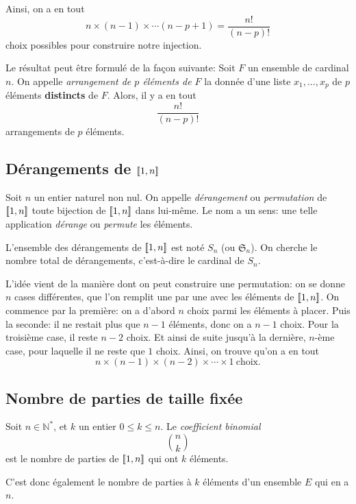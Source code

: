 \documentclass[11pt]{article}
\newcommand{\N}{\mathbb N}
\DeclarePairedDelimiter{\zint}{[\![}{]\!]}
\theoremstyle{definition}
\theoremstyle{remark}
\theoremstyle{theorem}
\begin{document}
Ainsi, on a en tout
\[
n\times (n-1)\times \cdots (n-p+1) = \frac{n!}{(n-p)!}
\]
choix possibles pour construire notre injection.

\begin{rem}
Le résultat peut être formulé de la façon suivante: Soit $F$ un ensemble de cardinal $n$. On appelle \textit{arrangement de $p$ éléments de $F$} la donnée d'une liste $x_1,\ldots,x_p$ de $p$ éléments \textbf{distincts} de $F$. Alors, il y a en tout
\[
\frac{n!}{(n-p)!}
\]
arrangements de $p$ éléments.
\end{rem}


\subsection{Dérangements de $\zint{1,n}$}

Soit $n$ un entier naturel non nul. On appelle \textit{dérangement} ou \textit{permutation} de $\zint{1,n}$ toute bijection de $\zint{1,n}$ dans lui-même. Le nom a un sens: une telle application \textit{dérange} ou \textit{permute} les éléments.

L'ensemble des dérangements de $\zint{1,n}$ est noté $S_n$ (ou $\mathfrak{S}_n$). On cherche le nombre total de dérangements, c'est-à-dire le cardinal de $S_n$.

L'idée vient de la manière dont on peut construire une permutation: on se donne $n$ cases différentes, que l'on remplit une par une avec les éléments de $\zint{1,n}$. On commence par la première: on a d'abord $n$ choix parmi les éléments à placer. Puis la seconde: il ne restait plus que $n-1$ éléments, donc on a $n-1$ choix. Pour la troisième case, il reste $n-2$ choix. Et ainsi de suite jusqu'à la dernière, $n$-ème case, pour laquelle il ne reste que $1$ choix. Ainsi, on trouve qu'on a en tout
\[ n\times (n-1)\times (n-2)\times\cdots\times 1\ \text{choix}. \]



\subsection{Nombre de parties de taille fixée}

\begin{defn}
	Soit $n\in\N^*$, et $k$ un entier $0\leq k\leq n$. Le \textit{coefficient binomial}
	\[
	\binom{n}{k}
	\]
	est le nombre de parties de $\zint{1,n}$ qui ont $k$ éléments.
\end{defn}

C'est donc également le nombre de parties à $k$ éléments d'un ensemble $E$ qui en a $n$.
\end{document}
